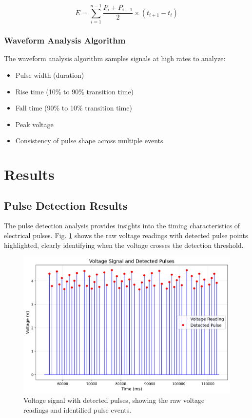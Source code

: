 \documentclass[conference]{IEEEtran}
\begin{document}
\begin{equation}
E = \sum_{i=1}^{n-1} \frac{P_i + P_{i+1}}{2} \times (t_{i+1} - t_i)
\end{equation}

\subsubsection{Waveform Analysis Algorithm}
The waveform analysis algorithm samples signals at high rates to analyze:
\begin{itemize}
    \item Pulse width (duration)
    \item Rise time (10\% to 90\% transition time)
    \item Fall time (90\% to 10\% transition time)
    \item Peak voltage
    \item Consistency of pulse shape across multiple events
\end{itemize}

\section{Results}

\subsection{Pulse Detection Results}
The pulse detection analysis provides insights into the timing characteristics of electrical pulses. Fig. \ref{fig:pulse_signal} shows the raw voltage readings with detected pulse points highlighted, clearly identifying when the voltage crosses the detection threshold.

\begin{figure}[htbp]
    \centering
    \includegraphics[width=\linewidth]{data/pulse_session_2025-05-09_1442/plots/pulse_signal.png}
    \caption{Voltage signal with detected pulses, showing the raw voltage readings and identified pulse events.}
    \label{fig:pulse_signal}
\end{figure}
\end{document}
